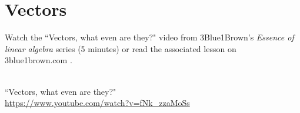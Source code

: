 \section{Vectors}

Watch the ``Vectors, what even are they?" video from 3Blue1Brown's
\textit{Essence of linear algebra} series (5 minutes) or read the associated
lesson on 3blue1brown.com
\cite{bib:3b1b_linalg_vectors}.
\begin{bookfigure}
   \\
  \tiny
  ``Vectors, what even are they?" \\
  \url{https://www.youtube.com/watch?v=fNk_zzaMoSs}
\end{bookfigure}
